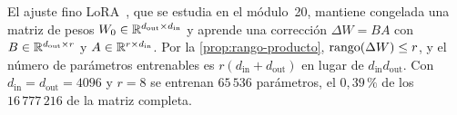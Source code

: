 \begin{observacion}\label{obs:lora-rango}
El ajuste fino LoRA~\cite{hu-lora}, que se estudia en el módulo~20, mantiene congelada una matriz de pesos $W_0\in\mathbb{R}^{d_{\text{out}}\times d_{\text{in}}}$ y aprende una corrección $\Delta W=BA$ con $B\in\mathbb{R}^{d_{\text{out}}\times r}$ y $A\in\mathbb{R}^{r\times d_{\text{in}}}$. Por la \cref{prop:rango-producto}, $\operatorname{rango}(\Delta W)\le r$, y el número de parámetros entrenables es $r(d_{\text{in}}+d_{\text{out}})$ en lugar de $d_{\text{in}}d_{\text{out}}$. Con $d_{\text{in}}=d_{\text{out}}=4096$ y $r=8$ se entrenan $65\,536$ parámetros, el $0{,}39\,\%$ de los $16\,777\,216$ de la matriz completa.
\end{observacion}

